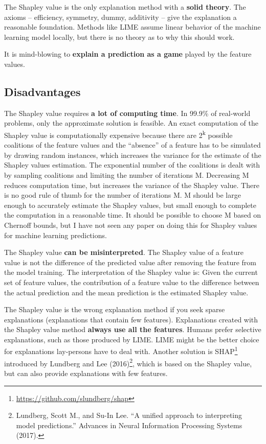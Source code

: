 \documentclass[
  10pt,
]{scrbook}
\renewcommand{\href}[2]{#2\footnote{\url{#1}}}
\begin{document}
The Shapley value is the only explanation method with a \textbf{solid theory}.
The axioms -- efficiency, symmetry, dummy, additivity -- give the explanation a reasonable foundation.
Methods like LIME assume linear behavior of the machine learning model locally, but there is no theory as to why this should work.

It is mind-blowing to \textbf{explain a prediction as a game} played by the feature values.

\hypertarget{disadvantages-16}{%
\subsection{Disadvantages}\label{disadvantages-16}}

The Shapley value requires \textbf{a lot of computing time}.
In 99.9\% of real-world problems, only the approximate solution is feasible.
An exact computation of the Shapley value is computationally expensive because there are 2\textsuperscript{k} possible coalitions of the feature values and the ``absence'' of a feature has to be simulated by drawing random instances, which increases the variance for the estimate of the Shapley values estimation.
The exponential number of the coalitions is dealt with by sampling coalitions and limiting the number of iterations M.
Decreasing M reduces computation time, but increases the variance of the Shapley value.
There is no good rule of thumb for the number of iterations M.
M should be large enough to accurately estimate the Shapley values, but small enough to complete the computation in a reasonable time.
It should be possible to choose M based on Chernoff bounds, but I have not seen any paper on doing this for Shapley values for machine learning predictions.

The Shapley value \textbf{can be misinterpreted}.
The Shapley value of a feature value is not the difference of the predicted value after removing the feature from the model training.
The interpretation of the Shapley value is:
Given the current set of feature values, the contribution of a feature value to the difference between the actual prediction and the mean prediction is the estimated Shapley value.

The Shapley value is the wrong explanation method if you seek sparse explanations (explanations that contain few features).
Explanations created with the Shapley value method \textbf{always use all the features}.
Humans prefer selective explanations, such as those produced by LIME.
LIME might be the better choice for explanations lay-persons have to deal with.
Another solution is \href{https://github.com/slundberg/shap}{SHAP} introduced by Lundberg and Lee (2016)\footnote{Lundberg, Scott M., and Su-In Lee. ``A unified approach to interpreting model predictions.'' Advances in Neural Information Processing Systems (2017).}, which is based on the Shapley value, but can also provide explanations with few features.
\end{document}
